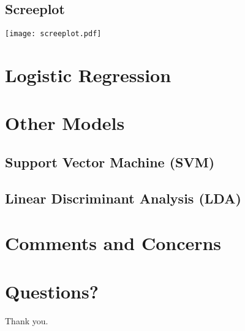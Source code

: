 \documentclass[a4paper, landscape]{article}
\begin{document}
\subsection{Screeplot}
\centerline{\texttt{[image: screeplot.pdf]}}

\newpage
\section{Logistic Regression}

\section{Other Models}
\newpage
\subsection{Support Vector Machine (SVM)}

\subsection{Linear Discriminant Analysis (LDA)}

\begin{center}

\end{center}

\newpage
\section{Comments and Concerns}

\newpage
\section{Questions?}

Thank you.
\end{document}
